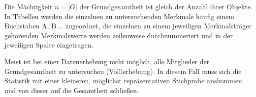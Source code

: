 \documentclass[a4paper]{article}
\begin{document}








Die Mächtigkeit $n = |G|$ der Grundgesamtheit ist gleich der Anzahl ihrer
Objekte. In Tabellen werden die einzelnen zu untersuchenden Merkmale häufig
einem Buchstaben $\mathrm{A},\, \mathrm{B}\, \ldots$ zugeordnet, die einzelnen zu
einem jeweiligen Merkmalsträger gehörenden Merkmalswerte werden zeilenweise
durchnummeriert und in der jeweiligen Spalte eingetragen.












Meist ist bei einer Datenerhebung nicht möglich, alle Mitglieder der
Grundgesamtheit zu untersuchen (\textquotedbl{}Volllerhebung\textquotedbl{}). In diesem Fall muss sich die
Statistik mit einer kleineren, möglichst repräsentativen Stichprobe auskommen
und von dieser auf die Gesamtheit schließen.
\end{document}

